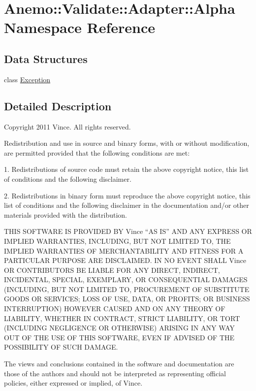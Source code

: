 \hypertarget{namespace_anemo_1_1_validate_1_1_adapter_1_1_alpha}{
\section{Anemo::Validate::Adapter::Alpha Namespace Reference}
\label{namespace_anemo_1_1_validate_1_1_adapter_1_1_alpha}
}
\subsection*{Data Structures}
\begin{DoxyCompactItemize}
\item 
class \hyperlink{class_anemo_1_1_validate_1_1_adapter_1_1_alpha_1_1_exception}{Exception}
\end{DoxyCompactItemize}


\subsection{Detailed Description}
Copyright 2011 Vince. All rights reserved.

Redistribution and use in source and binary forms, with or without modification, are permitted provided that the following conditions are met:

1. Redistributions of source code must retain the above copyright notice, this list of conditions and the following disclaimer.

2. Redistributions in binary form must reproduce the above copyright notice, this list of conditions and the following disclaimer in the documentation and/or other materials provided with the distribution.

THIS SOFTWARE IS PROVIDED BY Vince ``AS IS'' AND ANY EXPRESS OR IMPLIED WARRANTIES, INCLUDING, BUT NOT LIMITED TO, THE IMPLIED WARRANTIES OF MERCHANTABILITY AND FITNESS FOR A PARTICULAR PURPOSE ARE DISCLAIMED. IN NO EVENT SHALL Vince OR CONTRIBUTORS BE LIABLE FOR ANY DIRECT, INDIRECT, INCIDENTAL, SPECIAL, EXEMPLARY, OR CONSEQUENTIAL DAMAGES (INCLUDING, BUT NOT LIMITED TO, PROCUREMENT OF SUBSTITUTE GOODS OR SERVICES; LOSS OF USE, DATA, OR PROFITS; OR BUSINESS INTERRUPTION) HOWEVER CAUSED AND ON ANY THEORY OF LIABILITY, WHETHER IN CONTRACT, STRICT LIABILITY, OR TORT (INCLUDING NEGLIGENCE OR OTHERWISE) ARISING IN ANY WAY OUT OF THE USE OF THIS SOFTWARE, EVEN IF ADVISED OF THE POSSIBILITY OF SUCH DAMAGE.

The views and conclusions contained in the software and documentation are those of the authors and should not be interpreted as representing official policies, either expressed or implied, of Vince. 